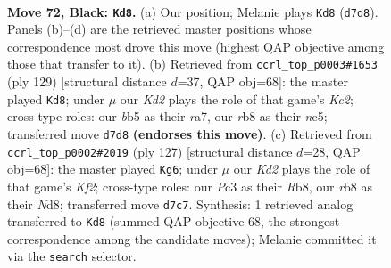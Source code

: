 \documentclass[11pt]{article}
\begin{document}
\clearpage

\begin{figure}[p]\centering
\begin{subfigure}{0.46\textwidth}\centering
\resizebox{\linewidth}{!}{%
\newchessgame
\chessboard[
  setfen={1Rn5/3k3p/P7/1BP5/5r2/2p4P/2P3P1/4K3 b - - 8 72},
  showmover=false,
  pgfstyle=straightmove, color=movearrow, markmove={d7-d8}
]}
\caption{}
\end{subfigure}\hfill
\begin{subfigure}{0.46\textwidth}\centering
\resizebox{\linewidth}{!}{%
\newchessgame
\chessboard[
  setfen={8/R1k5/4p3/P1P1N3/3n1p2/2K4p/1P3P2/7r b - - 1 65},
  showmover=false,
  pgfstyle=straightmove, color=movearrow, markmove={c7-d8}
]}
\caption{}
\end{subfigure}
\\[4pt]
\begin{subfigure}{0.46\textwidth}\centering
\resizebox{\linewidth}{!}{%
\newchessgame
\chessboard[
  setfen={1r1n4/3R1k2/8/p1p1P3/2P3B1/1P4P1/6K1/8 b - - 2 64},
  showmover=false,
  pgfstyle=straightmove, color=movearrow, markmove={f7-g6}
]}
\caption{}
\end{subfigure}\hfill

\caption{\textbf{Move 72, Black: \texttt{Kd8}.} (a) Our position; Melanie plays \texttt{Kd8} (\texttt{d7d8}). Panels (b)--(d) are the retrieved master positions whose correspondence most drove this move (highest QAP objective among those that transfer to it). (b) Retrieved from \texttt{ccrl\_top\_p0003\#1653} (ply 129) [structural distance $d$=37, QAP obj=68]: the master played \texttt{Kd8}; under $\mu$ our \emph{Kd2} plays the role of that game's \emph{Kc2}; cross-type roles: our \emph{b}b5 as their \emph{r}a7, our \emph{r}b8 as their \emph{n}e5; transferred move \texttt{d7d8} \textbf{(endorses this move)}. (c) Retrieved from \texttt{ccrl\_top\_p0002\#2019} (ply 127) [structural distance $d$=28, QAP obj=68]: the master played \texttt{Kg6}; under $\mu$ our \emph{Kd2} plays the role of that game's \emph{Kf2}; cross-type roles: our \emph{P}c3 as their \emph{R}b8, our \emph{r}b8 as their \emph{N}d8; transferred move \texttt{d7c7}. Synthesis: 1 retrieved analog transferred to \texttt{Kd8} (summed QAP objective 68, the strongest correspondence among the candidate moves); Melanie committed it via the \texttt{search} selector.}
\label{fig:thought-m143}
\end{figure}

\clearpage
\end{document}
